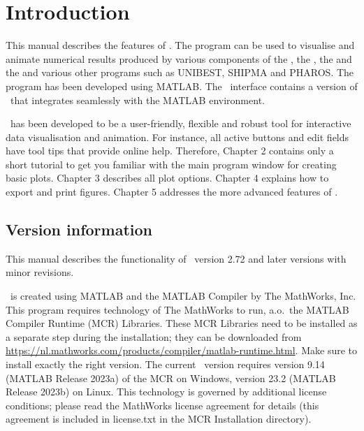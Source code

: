 

\chapter{Introduction} \label{Chp:Introduction}
This manual describes the features of \QUICKPLOT.
The program can be used to visualise and animate numerical results produced by various components of the \dfmsuite, the \dhydrosuite, the \dfoursuite and the \sobeksuite and various other programs such as UNIBEST, SHIPMA and PHAROS.
The program has been developed using MATLAB.
The \DMATLAB\ interface contains a version of \QUICKPLOT\ that integrates seamlessly with the MATLAB environment.

\QUICKPLOT\ has been developed to be a user-friendly, flexible and robust tool for interactive data visualisation and animation.
For instance, all active buttons and edit fields have tool tips that provide online help.
Therefore, Chapter 2 contains only a short tutorial to get you familiar with the main program window for creating basic plots.
Chapter 3 describes all plot options.
Chapter 4 explains how to export and print figures.
Chapter 5 addresses the more advanced features of \QUICKPLOT.

\section{Version information}
This manual describes the functionality of \QUICKPLOT\ version 2.72 and later versions with minor revisions.

\QUICKPLOT\ is created using MATLAB and the MATLAB Compiler by The MathWorks, Inc.
This program requires technology of The MathWorks to run, a.o.\ the MATLAB Compiler Runtime (MCR) Libraries.
These MCR Libraries need to be installed as a separate step during the installation; they can be downloaded from \url{https://nl.mathworks.com/products/compiler/matlab-runtime.html}.
Make sure to install exactly the right version.
The current \QUICKPLOT\ version requires version 9.14 (MATLAB Release 2023a) of the MCR on Windows, version 23.2 (MATLAB Release 2023b) on Linux.
This technology is governed by additional license conditions; please read the MathWorks license agreement for details (this agreement is included in license.txt in the MCR Installation directory).